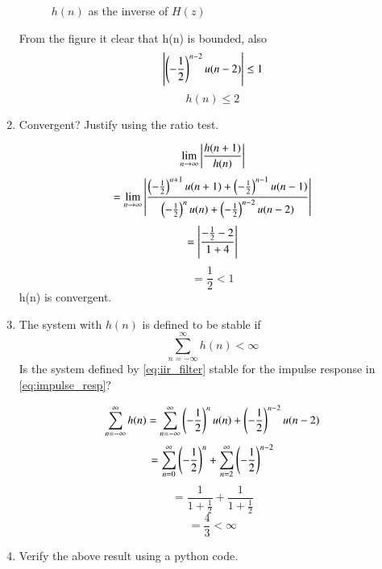 \documentclass[journal,12pt,twocolumn]{IEEEtran}
\renewcommand\thesection{\arabic{section}}
\begin{document}
\begin{enumerate}[label=\thesection.\arabic*]
\begin{figure}[ht]
\caption{$h(n)$ as the inverse of $H(z)$}
\label{fig:hn}
\end{figure}
From the figure it clear that h(n) is bounded, also
\[\left\vert\left(-\frac{1}{2}\right)^{n-2}u(n-2)\right\vert \leq 1\]
\[h(n) \leq 2\]
%
\item Convergent? Justify using the ratio test.

\solution
\[ \lim_{n \to \infty}\left\vert\frac{h(n+1)}{h(n)}\right\vert \]
\[= \lim_{n \to \infty}\left\vert\frac{\left(-\frac{1}{2}\right)^{n+1}u(n+1) + \left(-\frac{1}{2}\right)^{n-1}u(n-1)}{\left(-\frac{1}{2}\right)^{n}u(n) + \left(-\frac{1}{2}\right)^{n-2}u(n-2)}\right\vert\]
\[= \left\vert\frac{-\frac{1}{2} - 2}{1 + 4}\right\vert\]
\[= \frac{1}{2} < 1\]
h(n) is convergent.
\item The system with $h(n)$ is defined to be stable if
\begin{equation}
\sum_{n=-\infty}^{\infty}h(n) < \infty
\end{equation}
Is the system defined by \eqref{eq:iir_filter} stable for the impulse response in \eqref{eq:impulse_resp}?

\solution
\[ \sum_{n=-\infty}^{\infty}h(n) = \sum_{n=-\infty}^{\infty}\left(-\frac{1}{2}\right)^{n}u(n) + \left(-\frac{1}{2}\right)^{n-2}u(n-2)\]
\[= \sum_{n=0}^{\infty}\left(-\frac{1}{2}\right)^{n} + \sum_{n=2}^{\infty}\left(-\frac{1}{2}\right)^{n-2}\]
\[= \frac{1}{1 + \frac{1}{2}} + \frac{1}{1 + \frac{1}{2}}\]
\[= \frac{4}{3} < \infty\]
%
\item Verify the above result using a python code.


\end{enumerate}
\end{document}
